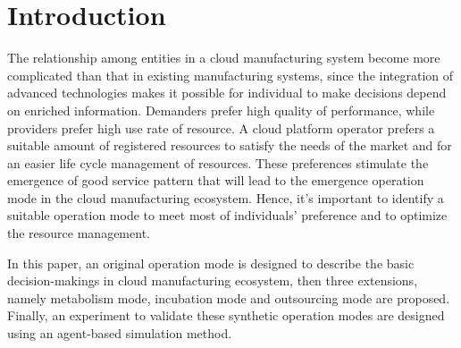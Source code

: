 \section{Introduction}
The relationship among entities in a cloud manufacturing system become more complicated than that in existing manufacturing systems, since the integration of advanced technologies makes it possible for individual to make decisions depend on enriched information. Demanders prefer high quality of performance, while providers prefer high use rate of resource. A cloud platform operator prefers a suitable amount of registered resources to satisfy the needs of the market and for an easier life cycle management of resources. These preferences stimulate the emergence of good service pattern that will lead to the emergence operation mode in the cloud manufacturing ecosystem. Hence, it's important to identify a suitable operation mode to meet most of individuals' preference and to optimize the resource management.

In this paper, an original operation mode is designed to describe the basic decision-makings in cloud manufacturing ecosystem, then three extensions, namely metabolism mode, incubation mode and outsourcing mode are proposed. Finally, an experiment to validate these synthetic operation modes are designed using an agent-based simulation method.
